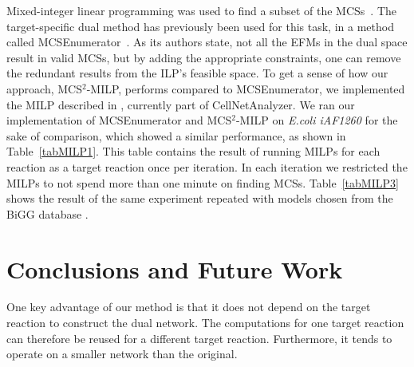 \documentclass{bioinfo}
\theoremstyle{plain}
\theoremstyle{definition}
\begin{document}
Mixed-integer linear programming was used to find a subset of the MCSs~\cite{sequentialEFM}. The target-specific dual method has previously been used for this task, in a method called MCSEnumerator~\cite{MCSs-MILP-Dual,MCSs-MILP-Dual2}. As its authors state, not all the EFMs in the dual space result in valid MCSs, but by adding the appropriate constraints, one can remove the redundant results from the ILP's feasible space. To get a sense of how our approach, MCS$^2$-MILP, performs compared to MCSEnumerator, we implemented the MILP described in \cite{MCSs-MILP-Dual}, currently part of CellNetAnalyzer. We ran our implementation of MCSEnumerator \cite{MCSs-MILP-Dual} and MCS$^2$-MILP on \textit{E.coli iAF1260} for the sake of comparison, which showed a similar performance, as shown in Table~\ref{tabMILP1}. This table contains the result of running MILPs for each reaction as a target reaction once per iteration. In each iteration we restricted the MILPs to not spend more than one minute on finding MCSs. Table~\ref{tabMILP3} shows the result of the same experiment repeated with models chosen from the BiGG database \cite{BiGG}.

\vspace{-0.5cm}

\section{Conclusions and Future Work}
One key advantage of our method is that it does not depend on the target reaction to construct the dual network.  The computations for one target reaction can therefore be reused for a different target reaction. Furthermore, it tends to operate on a smaller network than the original.
\end{document}
